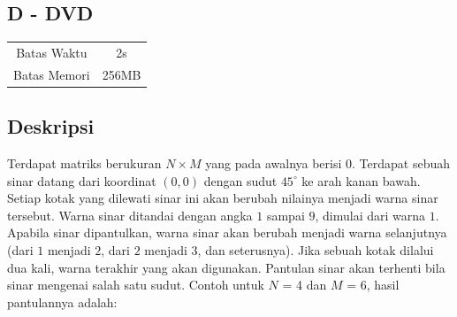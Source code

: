 \documentclass{article}
\begin{document}
\begin{center}
    \section*{D - DVD} %

    \begin{tabular}{ | c c | }
        \hline
        Batas Waktu  & 2s \\    %
        Batas Memori & 256MB \\  %
        \hline
    \end{tabular}
\end{center}

\subsection*{Deskripsi}

Terdapat matriks berukuran $N \times M$ yang pada awalnya berisi $0$. Terdapat sebuah sinar datang dari koordinat $(0, 0)$ dengan sudut $45^{\circ}$ ke arah kanan bawah. Setiap kotak yang dilewati sinar ini akan berubah nilainya menjadi warna sinar tersebut. Warna sinar ditandai dengan angka $1$ sampai $9$, dimulai dari warna $1$. Apabila sinar dipantulkan, warna sinar akan berubah menjadi warna selanjutnya (dari $1$ menjadi $2$, dari $2$ menjadi $3$, dan seterusnya). Jika sebuah kotak dilalui dua kali, warna terakhir yang akan digunakan. Pantulan sinar akan terhenti bila sinar mengenai salah satu sudut. Contoh untuk $N$ = 4 dan $M$ = 6, hasil pantulannya adalah:

\begin{center}
\end{center}
\end{document}
